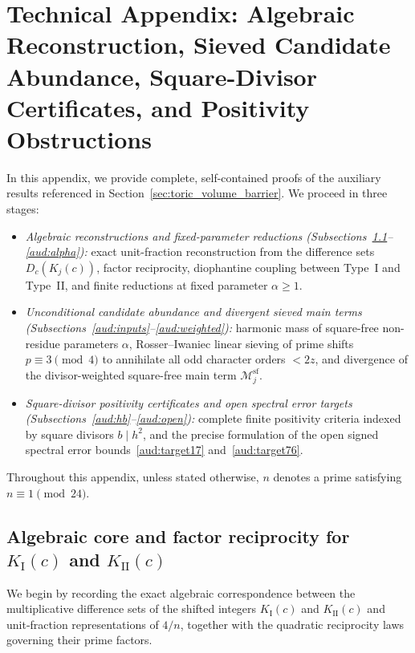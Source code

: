 \documentclass[11pt, a4paper]{article}
\theoremstyle{plain}
\theoremstyle{definition}
\newcommand{\I}{\mathrm{I}}
\newcommand{\II}{\mathrm{II}}
\newcommand{\sfm}{\mathrm{sf}}
\begin{document}
\appendix

\section{Technical Appendix: Algebraic Reconstruction, Sieved Candidate Abundance, Square-Divisor Certificates, and Positivity Obstructions}\label{app:audit}

In this appendix, we provide complete, self-contained proofs of the auxiliary results referenced in Section~\ref{sec:toric_volume_barrier}. We proceed in three stages:
\begin{itemize}
    \item \emph{Algebraic reconstructions and fixed-parameter reductions (Subsections~\ref{aud:algebra}--\ref{aud:alpha}):} exact unit-fraction reconstruction from the difference sets $D_c(K_j(c))$, factor reciprocity, diophantine coupling between Type~I and Type~II, and finite reductions at fixed parameter $\alpha\ge 1$.
    \item \emph{Unconditional candidate abundance and divergent sieved main terms (Subsections~\ref{aud:inputs}--\ref{aud:weighted}):} harmonic mass of square-free non-residue parameters $\alpha$, Rosser--Iwaniec linear sieving of prime shifts $p\equiv 3\pmod 4$ to annihilate all odd character orders $<2z$, and divergence of the divisor-weighted square-free main term $\mathcal{M}_j^{\sfm}$.
    \item \emph{Square-divisor positivity certificates and open spectral error targets (Subsections~\ref{aud:hb}--\ref{aud:open}):} complete finite positivity criteria indexed by square divisors $b\mid h^{2}$, and the precise formulation of the open signed spectral error bounds~\eqref{aud:target17} and~\eqref{aud:target76}.
\end{itemize}
Throughout this appendix, unless stated otherwise, $n$ denotes a prime satisfying $n\equiv1\pmod{24}$.

\subsection{Algebraic core and factor reciprocity for $K_{\I}(c)$ and $K_{\II}(c)$}\label{aud:algebra}

We begin by recording the exact algebraic correspondence between the multiplicative difference sets of the shifted integers $K_{\I}(c)$ and $K_{\II}(c)$ and unit-fraction representations of $4/n$, together with the quadratic reciprocity laws governing their prime factors.
\end{document}
